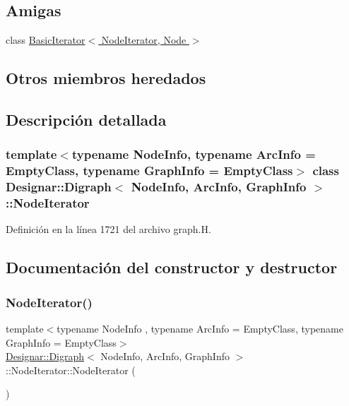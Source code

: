 \subsection*{Amigas}
\begin{DoxyCompactItemize}
\item 
class \hyperlink{class_designar_1_1_digraph_1_1_node_iterator_a21dc6ae614d097ff896e9e8e422d8f3c}{Basic\+Iterator$<$ Node\+Iterator, Node $>$}
\end{DoxyCompactItemize}
\subsection*{Otros miembros heredados}


\subsection{Descripción detallada}
\subsubsection*{template$<$typename Node\+Info, typename Arc\+Info = Empty\+Class, typename Graph\+Info = Empty\+Class$>$\newline
class Designar\+::\+Digraph$<$ Node\+Info, Arc\+Info, Graph\+Info $>$\+::\+Node\+Iterator}



Definición en la línea 1721 del archivo graph.\+H.



\subsection{Documentación del constructor y destructor}
\mbox{\label{class_designar_1_1_digraph_1_1_node_iterator_a53d6530188cf6c4ed6d2b2b114af9967}} 
\subsubsection{\texorpdfstring{Node\+Iterator()}{NodeIterator()}\hspace{0.1cm}{\footnotesize\ttfamily [1/5]}}
{\footnotesize\ttfamily template$<$typename Node\+Info , typename Arc\+Info  = Empty\+Class, typename Graph\+Info  = Empty\+Class$>$ \\
\hyperlink{class_designar_1_1_digraph}{Designar\+::\+Digraph}$<$ Node\+Info, Arc\+Info, Graph\+Info $>$\+::Node\+Iterator\+::\+Node\+Iterator (\begin{DoxyParamCaption}{ }\end{DoxyParamCaption})\hspace{0.3cm}{\ttfamily [inline]}}



